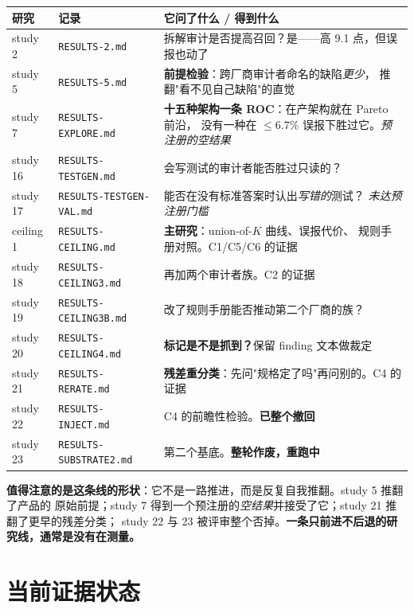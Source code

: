 \documentclass[11pt,a4paper]{article}
\begin{document}
\begin{center}
\begin{tabular}{@{}llp{7.4cm}@{}}
\toprule
\textbf{研究} & \textbf{记录} & \textbf{它问了什么 / 得到什么} \\
\midrule
study 2 & \texttt{RESULTS-2.md} & 拆解审计是否提高召回？是——高 9.1 点，但误报也动了 \\
study 5 & \texttt{RESULTS-5.md} & \textbf{前提检验}：跨厂商审计者命名的缺陷\emph{更少}，
  推翻"看不见自己缺陷"的直觉 \\
study 7 & \texttt{RESULTS-EXPLORE.md} & \textbf{十五种架构一条 ROC}：在产架构就在 Pareto 前沿，
  没有一种在 $\le6.7\%$ 误报下胜过它。\emph{预注册的空结果} \\
study 16 & \texttt{RESULTS-TESTGEN.md} & 会写测试的审计者能否胜过只读的？ \\
study 17 & \texttt{RESULTS-TESTGEN-VAL.md} & 能否在没有标准答案时认出\emph{写错的}测试？
  \emph{未达预注册门槛} \\
ceiling 1 & \texttt{RESULTS-CEILING.md} & \textbf{主研究}：union-of-$K$ 曲线、误报代价、
  规则手册对照。C1/C5/C6 的证据 \\
study 18 & \texttt{RESULTS-CEILING3.md} & 再加两个审计者族。C2 的证据 \\
study 19 & \texttt{RESULTS-CEILING3B.md} & 改了规则手册能否推动第二个厂商的族？ \\
study 20 & \texttt{RESULTS-CEILING4.md} & \textbf{标记是不是抓到？}保留 finding 文本做裁定 \\
study 21 & \texttt{RESULTS-RERATE.md} & \textbf{残差重分类}：先问"规格定了吗"再问别的。C4 的证据 \\
study 22 & \texttt{RESULTS-INJECT.md} & C4 的前瞻性检验。\textbf{已整个撤回} \\
study 23 & \texttt{RESULTS-SUBSTRATE2.md} & 第二个基底。\textbf{整轮作废，重跑中} \\
\bottomrule
\end{tabular}
\end{center}

\textbf{值得注意的是这条线的形状}：它不是一路推进，而是反复自我推翻。study 5 推翻了产品的
原始前提；study 7 得到一个预注册的\emph{空结果}并接受了它；study 21 推翻了更早的残差分类；
study 22 与 23 被评审整个否掉。\textbf{一条只前进不后退的研究线，通常是没有在测量。}

\section{当前证据状态}
\end{document}

